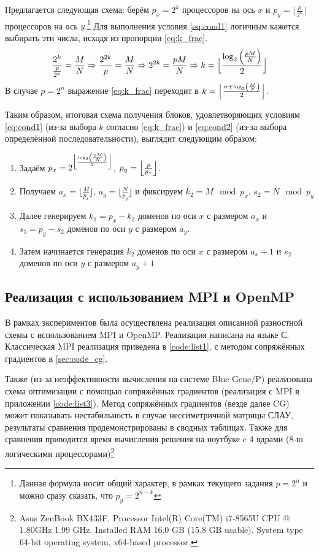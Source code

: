 \documentclass[12pt, fleqn]{article}
\theoremstyle{definition}
\begin{document}
Предлагается следующая схема: берём $p_x = 2^k$ процессоров на ось $x$ и $p_y = \lfloor\frac{p}{2^k}\rfloor$ процессоров на ось $y$.\footnote{Данная формула носит общий характер, в рамках текущего задания $p=2^n$ и можно сразу сказать, что $p_y = 2^{n-k}$} Для выполнения условия \ref{eq:cond1} логичным кажется выбирать эти числа, исходя из пропорции \ref{eq:k_frac}.
\begin{gather}
 \frac{2^k}{\frac{p}{2^k}} = \frac{M}{N} \Rightarrow \frac{2^{2k}}{p} = \frac{M}{N} \Rightarrow 2^{2k} = \frac{pM}{N} \Rightarrow k = \Bigl\lfloor \frac{\log_2\left(\frac{pM}{N}\right)}{2}\Bigr\rfloor \label{eq:k_frac}
\end{gather}
В случае $p=2^n$ выражение \ref{eq:k_frac} переходит в $k = \Bigl\lfloor \frac{n + \log_2\left(\frac{M}{N}\right)}{2}\Bigr\rfloor $.

Таким образом, итоговая схема получения блоков, удовлетворяющих условиям \ref{eq:cond1} (из-за выбора $k$ согласно \ref{eq:k_frac}) и \ref{eq:cond2} (из-за выбора определённой последовательности), выглядит следующим образом:
\begin{enumerate}
 \item Задаём $p_x = 2^{\Bigl\lfloor \frac{\log_2\left(\frac{pM}{N}\right)}{2}\Bigr\rfloor}$, $p_y = \Bigl\lfloor\frac{p}{p_x}\Bigr\rfloor$.
 \item Получаем $a_x = \lfloor \frac{M}{p_x}\rfloor$, $a_y = \lfloor \frac{N}{p_y}\rfloor$ и фиксируем $k_2 = M \mod p_x$, $s_2 = N \mod p_y$
 \item Далее генерируем $k_1 = p_x - k_2$ доменов по оси $x$ с размером $a_x$ и $s_1 = p_y - s_2$ доменов по оси $y$ с размером $a_y$.
 \item Затем начинается генерация $k_2$ доменов по оси $x$ с размером $a_x + 1$ и $s_2$ доменов по оси $y$ с размером $a_y + 1$
\end{enumerate}
\subsection{Реализация с использованием MPI и OpenMP}
В рамках экспериментов была осуществлена реализация описанной разностной схемы с использованием MPI и OpenMP. Реализация написана на языке С. Классическая MPI реализация приведена в \ref{code:list1}, с методом сопряжённых градиентов в \ref{sec:code_cg}. 

Также (из-за неэффективности вычисления на системе Blue Gene/P) реализована схема оптимизации с помощью сопряжённых градиентов (реализация с MPI в приложении \ref{code:list3}). Метод сопряжённых градиентов (везде далее CG) может показывать нестабильность в случае нессиметричной матрицы СЛАУ, результаты сравнения продемонстрированы в сводных таблицах. Также для сравнения приводится время вычисления решения на ноутбуке c 4 ядрами (8-ю логическими процессорами)\footnote{Asus ZenBook BX433F, Processor	Intel(R) Core(TM) i7-8565U CPU @ 1.80GHz   1.99 GHz. Installed RAM	16.0 GB (15.8 GB usable). System type	64-bit operating system, x64-based processor.}
\end{document}
